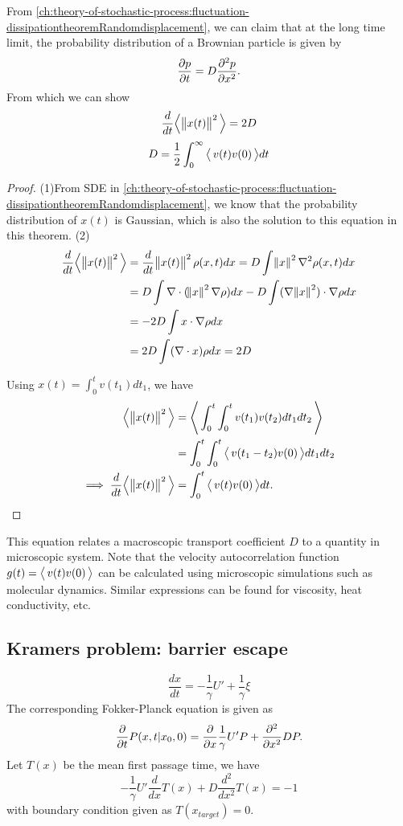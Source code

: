 \begin{refsection}
\begin{theorem}\cite[177]{weinan2011principles}
	From \autoref{ch:theory-of-stochastic-process:fluctuation-dissipationtheoremRandomdisplacement}, we can claim that at the long time limit, the probability distribution of a Brownian particle is given by
	$$\frac{\partial p}{\partial t} = D \frac{\partial^2 p}{\partial x^2}.$$
	From which we can show 	
	$$\frac{d}{dt} {\left< \, \norm{x(t)}^2 \, \right>} = 2D$$
	$$D = \frac{1}{2} \int_0^\infty {\left< \, v(t)v(0) \, \right>} dt$$
\end{theorem}
\begin{proof}
	(1)From SDE in \autoref{ch:theory-of-stochastic-process:fluctuation-dissipationtheoremRandomdisplacement}, we know that the probability distribution of $x(t)$ is Gaussian, which is also the solution to this equation in this theorem.
	(2)
	\begin{align*}
	\frac{d}{dt} {\left< \, \norm{x(t)}^2 \, \right>} &= \frac{d}{dt} \norm{x(t)}^2 \rho(x,t)dx = D\int \norm{x}^2\nabla^2 \rho(x,t)dx\\
	&=D\int \nabla \cdot (\norm{x}^2 \nabla \rho) dx - D\int (\nabla \norm{x}^2) \cdot \nabla \rho dx\\
	&=-2D\int x\cdot \nabla \rho dx \\
	&=2D \int (\nabla \cdot x) \rho dx = 2D
	\end{align*}
	
	
	
	Using $x(t) = \int_0^t v(t_1)dt_1$, we have
	\begin{align*}
	{\left< \, \norm{x(t)}^2 \, \right>} &= {\left< \, \int_0^t\int_0^t v(t_1)v(t_2)dt_1dt_2 \, \right>}\\
	&= \int_0^t\int_0^t {\left< \, v(t_1-t_2)v(0) \, \right>}dt_1dt_2\\
	\implies \frac{d}{dt} {\left< \, \norm{x(t)}^2 \, \right>} &= \int_0^t {\left< \, v(t)v(0) \, \right>}dt.
	\end{align*}
\end{proof}


\begin{remark}[interpretation]
	This equation relates a macroscopic transport coefficient $D$ to a quantity in microscopic system. Note that the velocity autocorrelation function $g(t) =
	{\left< \, v(t)v(0) \, \right>}$ can be calculated using microscopic
	simulations such as molecular dynamics. Similar expressions can be found for viscosity,
	heat conductivity, etc.
\end{remark}


\subsection{Kramers problem: barrier escape}
\begin{lemma}
	$$\frac{dx}{dt} = -\frac{1}{\gamma}U' + \frac{1}{\gamma}\xi$$
The corresponding Fokker-Planck equation is given as
$$\frac{\partial}{\partial t} P(x,t|x_0,0) = \frac{\partial}{\partial x} \frac{1}{\gamma} U'P + \frac{\partial^2}{\partial x^2} DP.$$
Let $T(x)$ be the mean first passage time, we have
$$-\frac{1}{\gamma} U' \frac{d}{dx} T(x) + D\frac{d^2}{dx^2}T(x) = -1$$
with boundary condition given as $T(x_{target}) = 0$.
\end{lemma}



\end{refsection}
